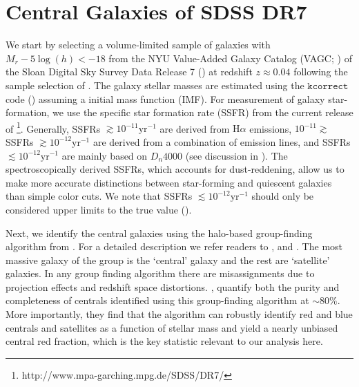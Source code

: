 \section{Central Galaxies of SDSS DR7} \label{sec:sdss}
We start by selecting a volume-limited sample of galaxies with  $M_r - 5\log(h) < -18$ from the NYU Value-Added Galaxy Catalog (VAGC; 
\citealt{Blanton:2005aa}) of the Sloan Digital Sky Survey Data Release 7
(\citealt{Abazajian:2009aa}) at redshift $z \approx 0.04$ following the 
sample selection of \cite{Tinker:2011aa}. 
The galaxy stellar masses are estimated using the $\mathtt{kcorrect}$ 
code (\citealt{Blanton:2007aa}) assuming a \cite{Chabrier:2003aa} initial 
mass function (IMF). For measurement of galaxy star-formation, we use the 
specific star formation rate (SSFR) from the current release of \cite{Brinchmann:2004aa}
\footnote{http://www.mpa-garching.mpg.de/SDSS/DR7/}. Generally, SSFRs 
$\gtrsim 10^{-11} \mathrm{yr}^{-1}$ are derived from $\mathrm{H}\alpha$ 
emissions, $10^{-11}\gtrsim$ SSFRs $\gtrsim 10^{-12} \mathrm{yr}^{-1}$ 
are derived from a combination of emission lines, and SSFRs
$\lesssim 10^{-12} \mathrm{yr}^{-1}$ are mainly based on $D_n4000$ 
(see discussion in \citealt{Wetzel:2013aa}). 
The spectroscopically derived SSFRs, which accounts for dust-reddening, 
allow us to make more accurate distinctions between star-forming and 
quiescent galaxies than simple color cuts. We note that SSFRs 
$\lesssim 10^{-12} \mathrm{yr}^{-1}$ should only be considered upper 
limits to the true value (\citealt{Salim:2007aa}).  

Next, we identify the central galaxies using the halo-based group-finding 
algorithm from \cite{Tinker:2011aa}. For a detailed description we refer
readers to \cite{Tinker:2011aa, Wetzel:2012aa, Wetzel:2013aa, Wetzel:2014aa}, 
and \cite{Tinker:2016ab}. 
The most massive galaxy of the group is the `central' galaxy and 
the rest are `satellite' galaxies. In any group finding algorithm 
there are misassignments due to projection effects and redshift 
space distortions. \cite{Campbell:2015aa}, quantify both the purity and 
completeness of centrals identified using this group-finding algorithm
at $\sim 80\%$. More importantly, they find that the algorithm 
can robustly identify red and blue centrals and satellites as a 
function of stellar mass and yield a nearly unbiased central red 
fraction, which is the key statistic relevant to our analysis here. 

